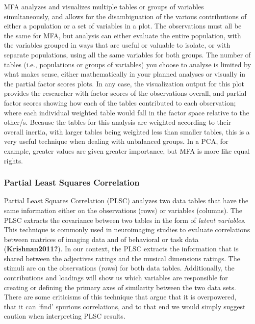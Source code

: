 \documentclass[
  english,
  man,floatsintext]{apa6}
\begin{document}
MFA analyzes and visualizes multiple tables or groups of variables simultaneously, and allows for the disambiguation of the various contributions of either a population or a set of variables in a plot. The observations must all be the same for MFA, but analysis can either evaluate the entire population, with the variables grouped in ways that are useful or valuable to isolate, or with separate populations, using all the same variables for both groups. The number of tables (i.e., populations or groups of variables) you choose to analyse is limited by what makes sense, either mathematically in your planned analyses or visually in the partial factor scores plots. In any case, the visualization output for this plot provides the researcher with factor scores of the observations overall, and partial factor scores showing how each of the tables contributed to each observation; where each individual weighted table would fall in the factor space relative to the other/s. Because the tables for this analysis are weighted according to their overall inertia, with larger tables being weighted less than smaller tables, this is a very useful technique when dealing with unbalanced groups. In a PCA, for example, greater values are given greater importance, but MFA is more like equal rights.

\hypertarget{partial-least-squares-correlation}{%
\subsubsection{Partial Least Squares Correlation}\label{partial-least-squares-correlation}}

Partial Least Squares Correlation (PLSC) analyzes two data tables that have the same information either on the observations (rows) or variables (columns). The PLSC extracts the covariance between two tables in the form of \emph{latent variables}. This technique is commonly used in neuroimaging studies to evaluate correlations between matrices of imaging data and of behavioral or task data (\textbf{Krishnan2011?}). In our context, the PLSC extracts the information that is shared between the adjectives ratings and the musical dimensions ratings. The stimuli are on the observations (rows) for both data tables. Additionally, the contributions and loadings will show us which variables are responsible for creating or defining the primary axes of similarity between the two data sets. There are some criticisms of this technique that argue that it is overpowered, that it can `find' spurious correlations, and to that end we would simply suggest caution when interpreting PLSC results.
\end{document}
